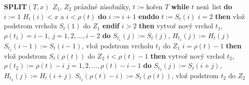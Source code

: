 {\bf SPLIT$\left(T,x\right)$\newline 
$Z_1$}, $Z_2$ pr\'azdn\'e z\'asobn\'\i ky, $t:=$ko\v ren $T$\newline 
{\bf while} $t$ nen\'\i\ list {\bf do}\newline
\phantom{---}$i:=1$\newline 
\phantom{---}{\bf while} $H_t\left(i\right)<x$ a $i<\rho \left(t\right)$ {\bf do} $i:=i+1$ {\bf enddo}\newline 
\phantom{---}$t:=S_t\left(i\right)$\newline 
\phantom{---}{\bf if} $i=2$ {\bf then} vlo\v z podstrom vrcholu $S_t\left(1\right)$ do $Z_1$ {\bf endif}\newline 
\phantom{---}{\bf if} $i>2$ {\bf then}\newline 
\phantom{------}vytvo\v r nov\'y vrchol $t_1$, $\rho \left(t_1\right)=i-1$,\newline 
\phantom{------}{\bf for every} $j=1,2,\dots,i-2$ {\bf do}\newline 
\phantom{---------}$S_{t_1}\left(j\right):=S_t\left(j\right)$, $H_{t_1}\left(j\right):=H_t\left(j\right)$\newline 
\phantom{------}{\bf enddo}\newline 
\phantom{------}$S_{t_1}\left(i-1\right):=S_t\left(i-1\right)$, vlo\v z podstrom vrcholu $t_1$ do $Z_1$\newline 
\phantom{---}{\bf endif}\newline 
\phantom{---}{\bf if} $i=\rho \left(t\right)-1$ {\bf then}\newline 
\phantom{------}vlo\v z podstrom $S_t\left(\rho \left(t\right)\right)$ do $Z_2$\newline 
\phantom{---}{\bf endif}\newline 
\phantom{---}{\bf if} $i<\rho \left(t\right)-1$ {\bf then}\newline 
\phantom{------}vytvo\v r nov\'y vrchol $t_2$, $\rho \left(t_2\right):=\rho \left(t\right)-i$\newline 
\phantom{------}{\bf for every} $j=1,2,\dots,\rho \left(t\right)-i-1$ {\bf do}\newline 
\phantom{---------}$S_{t_2}\left(j\right):=S_t\left(i+j\right)$, $H_{t_2}\left(j\right):=H_t\left(i+j\right)$\newline 
\phantom{------}{\bf enddo}\newline 
\phantom{------}$S_{t_2}\left(\rho \left(t\right)-i\right):=S_t\left(\rho \left(t\right)\right)$, vlo\v z podstrom $t_2$ do $Z_2$ \newline 
